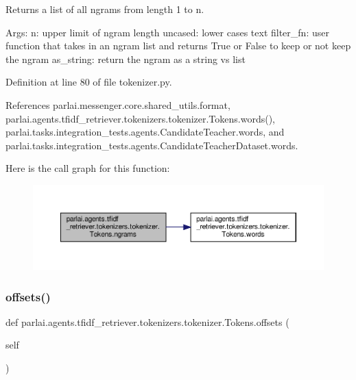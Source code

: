 \begin{DoxyVerb}Returns a list of all ngrams from length 1 to n.

Args:
    n: upper limit of ngram length
    uncased: lower cases text
    filter_fn: user function that takes in an ngram list and returns
      True or False to keep or not keep the ngram
    as_string: return the ngram as a string vs list
\end{DoxyVerb}
 

Definition at line 80 of file tokenizer.\+py.



References parlai.\+messenger.\+core.\+shared\+\_\+utils.\+format, parlai.\+agents.\+tfidf\+\_\+retriever.\+tokenizers.\+tokenizer.\+Tokens.\+words(), parlai.\+tasks.\+integration\+\_\+tests.\+agents.\+Candidate\+Teacher.\+words, and parlai.\+tasks.\+integration\+\_\+tests.\+agents.\+Candidate\+Teacher\+Dataset.\+words.

Here is the call graph for this function\+:
\nopagebreak
\begin{figure}[H]
\begin{center}
\leavevmode
\includegraphics[width=350pt]{classparlai_1_1agents_1_1tfidf__retriever_1_1tokenizers_1_1tokenizer_1_1Tokens_ae66797d00194acc3c67b42c7cf17dabf_cgraph}
\end{center}
\end{figure}
\mbox{\label{classparlai_1_1agents_1_1tfidf__retriever_1_1tokenizers_1_1tokenizer_1_1Tokens_ad64d5292cef77a2a02193ba836875ba7}} 
\subsubsection{\texorpdfstring{offsets()}{offsets()}}
{\footnotesize\ttfamily def parlai.\+agents.\+tfidf\+\_\+retriever.\+tokenizers.\+tokenizer.\+Tokens.\+offsets (\begin{DoxyParamCaption}\item[{}]{self }\end{DoxyParamCaption})}

